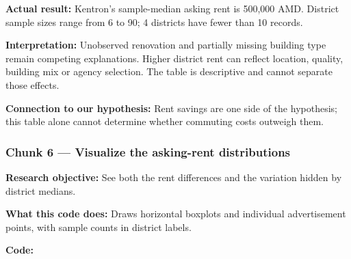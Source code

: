 \documentclass[
]{article}
\begin{document}
\textbf{Actual result:} Kentron's sample-median asking rent is 500,000
AMD. District sample sizes range from 6 to 90; 4 districts have fewer
than 10 records.

\textbf{Interpretation:} Unobserved renovation and partially missing
building type remain competing explanations. Higher district rent can
reflect location, quality, building mix or agency selection. The table
is descriptive and cannot separate those effects.

\textbf{Connection to our hypothesis:} Rent savings are one side of the
hypothesis; this table alone cannot determine whether commuting costs
outweigh them.

\subsubsection{Chunk 6 --- Visualize the asking-rent
distributions}\label{chunk-6-visualize-the-asking-rent-distributions}

\textbf{Research objective:} See both the rent differences and the
variation hidden by district medians.

\textbf{What this code does:} Draws horizontal boxplots and individual
advertisement points, with sample counts in district labels.

\textbf{Code:}
\end{document}
